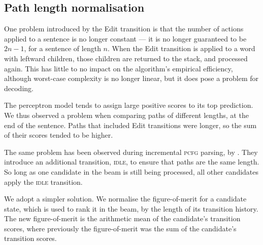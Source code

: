 \documentclass[11pt,letterpaper]{article}
\begin{document}



\subsection{Path length normalisation}

One problem introduced by the Edit transition is that the number of
actions applied to a sentence is no longer constant --- it is no longer guaranteed
to be $2n-1$, for a sentence of length $n$. When the Edit transition is
applied to a word with leftward children, those children are returned to the stack,
and processed again.  This has little to no impact on the algorithm's empirical
efficiency, although worst-case complexity is no longer linear, but it does
pose a problem for decoding.

The perceptron model tends to assign large positive scores to its top
prediction.
We thus observed a problem when comparing paths of different lengths, at the end
of the sentence. Paths that included Edit transitions were longer,
so the sum of their scores tended to be higher.

The same problem has been observed during incremental \textsc{pcfg} parsing,
by \citet{zhang:13}.  They introduce an additional transition, \textsc{idle},
to ensure that paths are the same length. So long as one candidate in the beam
is still being processed, all other candidates apply the \textsc{idle} transition.

We adopt a simpler solution.  We normalise the figure-of-merit for a candidate
state, which is used to rank
it in the beam, by the length of its transition history. The
new figure-of-merit is the arithmetic mean of the candidate's transition scores,
where previously the figure-of-merit was the sum of the candidate's transition
scores.
\end{document}
